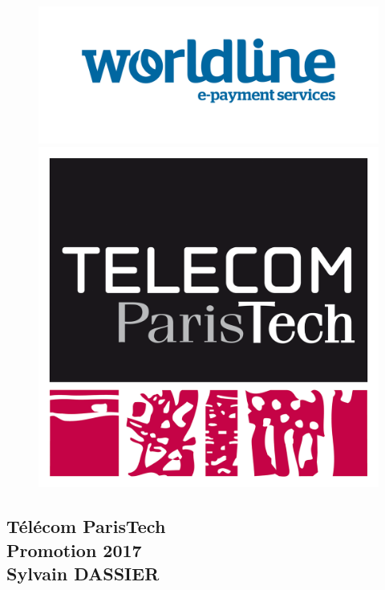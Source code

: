 \documentclass[a4paper,11pt]{article}
\begin{document}
	\fontsize{13pt}{18pt}\selectfont
	\begin{figure}[htbp]
		\begin{minipage}[b]{0.5\linewidth}
			\centering
			\includegraphics[width=\linewidth]{pictures/worldline.jpg}
		\end{minipage}
		\hspace{3cm}
		\begin{minipage}[b]{0.25\linewidth}
			\centering
			\includegraphics[width=\linewidth]{pictures/telecom.png}
		\end{minipage}
	\end{figure}

	\begin{center}
	\section*{Télécom ParisTech \\
	Promotion 2017 \\
	Sylvain DASSIER
	}
	\end{center}
\end{document}

